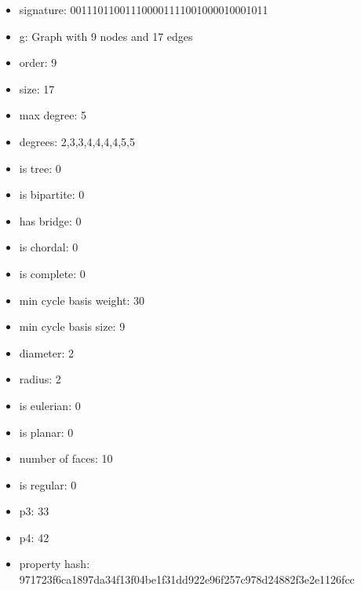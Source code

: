 \newpage
\begin{figure}
\end{figure}
\begin{itemize}
\item signature: 001110110011100001111001000010001011
\item g: Graph with 9 nodes and 17 edges
\item order: 9
\item size: 17
\item max degree: 5
\item degrees: 2,3,3,4,4,4,4,5,5
\item is tree: 0
\item is bipartite: 0
\item has bridge: 0
\item is chordal: 0
\item is complete: 0
\item min cycle basis weight: 30
\item min cycle basis size: 9
\item diameter: 2
\item radius: 2
\item is eulerian: 0
\item is planar: 0
\item number of faces: 10
\item is regular: 0
\item p3: 33
\item p4: 42
\item property hash: 971723f6ca1897da34f13f04be1f31dd922e96f257c978d24882f3e2e1126fcc
\end{itemize}
